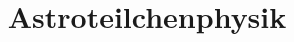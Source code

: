 


\subject{Zusammenfassung}
\title{Astroteilchenphysik}





\maketitle
\thispagestyle{empty}
\newpage






\printbibliography



